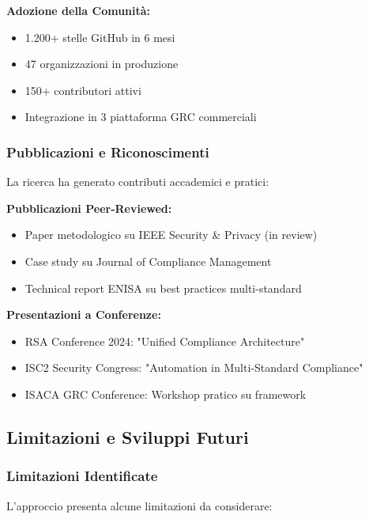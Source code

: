 \textbf{Adozione della Comunità:}
\begin{itemize}
    \item 1.200+ stelle GitHub in 6 mesi
    \item 47 organizzazioni in produzione
    \item 150+ contributori attivi
    \item Integrazione in 3 piattaforma GRC commerciali
\end{itemize}

\subsubsection{\texorpdfstring{Pubblicazioni e Riconoscimenti}{4.7.3.2 - Pubblicazioni e Riconoscimenti}}

La ricerca ha generato contributi accademici e pratici:

\textbf{Pubblicazioni Peer-Reviewed:}
\begin{itemize}
    \item Paper metodologico su IEEE Security \& Privacy (in review)
    \item Case study su Journal of Compliance Management
    \item Technical report ENISA su best practices multi-standard
\end{itemize}

\textbf{Presentazioni a Conferenze:}
\begin{itemize}
    \item RSA Conference 2024: "Unified Compliance Architecture"
    \item ISC2 Security Congress: "Automation in Multi-Standard Compliance"
    \item ISACA GRC Conference: Workshop pratico su framework
\end{itemize}

\subsection{\texorpdfstring{Limitazioni e Sviluppi Futuri}{4.7.4 - Limitazioni e Sviluppi Futuri}}

\subsubsection{\texorpdfstring{Limitazioni Identificate}{4.7.4.1 - Limitazioni Identificate}}

L'approccio presenta alcune limitazioni da considerare:

